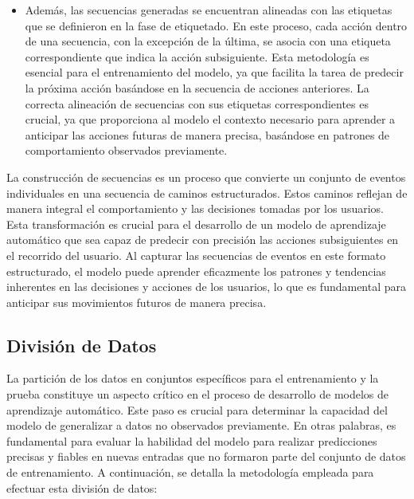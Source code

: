 \begin{itemize}
    \item Además, las secuencias generadas se encuentran alineadas con las etiquetas que se definieron en la fase de etiquetado. En este proceso, cada acción dentro de una secuencia, con la excepción de la última, se asocia con una etiqueta correspondiente que indica la acción subsiguiente. Esta metodología es esencial para el entrenamiento del modelo, ya que facilita la tarea de predecir la próxima acción basándose en la secuencia de acciones anteriores. La correcta alineación de secuencias con sus etiquetas correspondientes es crucial, ya que proporciona al modelo el contexto necesario para aprender a anticipar las acciones futuras de manera precisa, basándose en patrones de comportamiento observados previamente.
\end{itemize}

La construcción de secuencias es un proceso que convierte un conjunto de eventos individuales en una secuencia de caminos estructurados. Estos caminos reflejan de manera integral el comportamiento y las decisiones tomadas por los usuarios. Esta transformación es crucial para el desarrollo de un modelo de aprendizaje automático que sea capaz de predecir con precisión las acciones subsiguientes en el recorrido del usuario. Al capturar las secuencias de eventos en este formato estructurado, el modelo puede aprender eficazmente los patrones y tendencias inherentes en las decisiones y acciones de los usuarios, lo que es fundamental para anticipar sus movimientos futuros de manera precisa.

\subsection{División de Datos}
La partición de los datos en conjuntos específicos para el entrenamiento y la prueba constituye un aspecto crítico en el proceso de desarrollo de modelos de aprendizaje automático. Este paso es crucial para determinar la capacidad del modelo de generalizar a datos no observados previamente. En otras palabras, es fundamental para evaluar la habilidad del modelo para realizar predicciones precisas y fiables en nuevas entradas que no formaron parte del conjunto de datos de entrenamiento. A continuación, se detalla la metodología empleada para efectuar esta división de datos:

